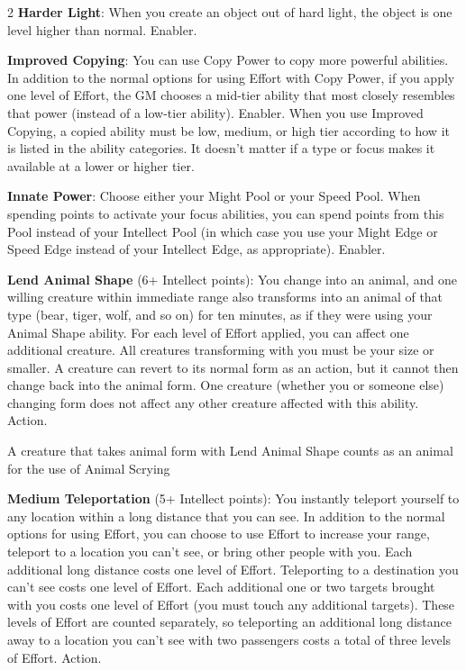 \begin{multicols}{2}
\textbf{Harder Light}: When you create an object out of hard light, the object is one level higher than normal. Enabler.

\textbf{Improved Copying}: You can use Copy Power to copy more powerful abilities. In addition to the normal options for using Effort with Copy Power, if you apply one level of Effort, the GM chooses a mid-tier ability that most closely resembles that power (instead of a low-tier ability). Enabler.
When you use Improved Copying, a copied ability must be low, medium, or high tier according to how it is listed in the ability categories. It doesn’t matter if a type or focus makes it available at a lower or higher tier.

\textbf{Innate Power}: Choose either your Might Pool or your Speed Pool. When spending points to activate your focus abilities, you can spend points from this Pool instead of your Intellect Pool (in which case you use your Might Edge or Speed Edge instead of your Intellect Edge, as appropriate). Enabler.

\textbf{Lend Animal Shape} (6+ Intellect points): You change into an animal, and one willing creature within immediate range also transforms into an animal of that type (bear, tiger, wolf, and so on) for ten minutes, as if they were using your Animal Shape ability. For each level of Effort applied,
you can affect one additional creature. All creatures transforming with you must be your size or smaller. A creature can revert to its normal form as an action, but it cannot then change back into the animal form. One creature (whether you or someone else) changing form does not affect any other creature affected with this ability. Action.

A creature that takes animal form with Lend Animal Shape counts as an animal for the use of Animal Scrying

\textbf{Medium Teleportation} (5+ Intellect points): You instantly teleport yourself to any location within a long distance that you can see. In addition to the normal options for using Effort, you can choose to use Effort to increase your range, teleport to a location you can’t see, or bring other people with you. Each additional long distance costs one level of Effort. Teleporting to
a destination you can’t see costs one level of Effort. Each additional one or two targets brought with you costs one level of Effort (you must touch any additional targets). These levels of Effort are counted separately, so teleporting an additional long distance away to a location you can’t see with two passengers costs a total of three levels of Effort. Action.


\end{multicols}
